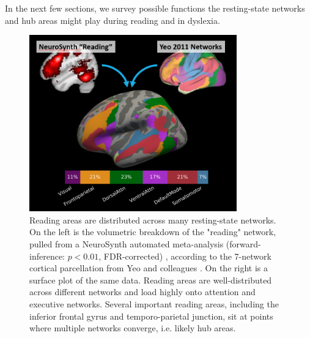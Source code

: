 In the next few sections, we survey possible functions the resting-state networks and hub areas might play during reading and in dyslexia.  

\begin{figure}
\centering
\includegraphics[height=3in]{images/ch1-yeo-to-neurosynth.png}
    \caption[Reading areas are distributed across many resting-state networks.]{Reading areas are distributed across many resting-state networks. On the left is the volumetric breakdown of the "reading" network, pulled from a NeuroSynth automated meta-analysis (forward-inference: $p < 0.01$, FDR-corrected) \citep{Yarkoni2011}, according to the 7-network cortical parcellation from Yeo and colleagues \citep{Yeo2011}. On the right is a surface plot of the same data. Reading areas are well-distributed across different networks and load highly onto attention and executive networks. Several important reading areas, including the inferior frontal gyrus and temporo-parietal junction, sit at points where multiple networks converge, i.e. likely hub areas.}
    \label{fig:ch1-yeo-to-neurosynth}
\end{figure}

